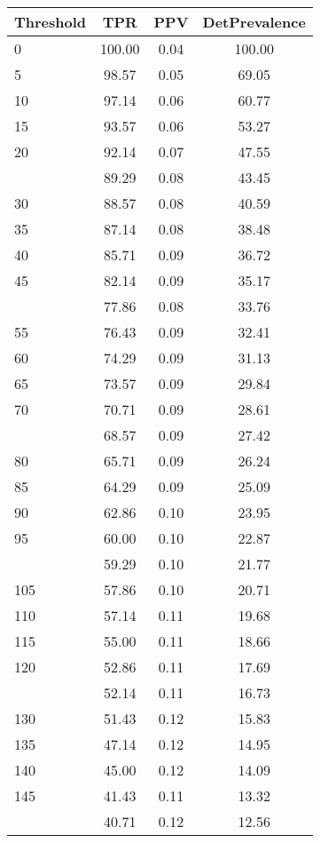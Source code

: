 \begin{table}[ht]
\centering
\begin{tabular}{lccc}
  \toprule
Threshold & TPR & PPV & DetPrevalence \\ 
  \midrule
0 & 100.00 & 0.04 & 100.00 \\ 
  5 & 98.57 & 0.05 & 69.05 \\ 
  10 & 97.14 & 0.06 & 60.77 \\ 
  15 & 93.57 & 0.06 & 53.27 \\ 
  20 & 92.14 & 0.07 & 47.55 \\ 
   \addlinespace
25 & 89.29 & 0.08 & 43.45 \\ 
  30 & 88.57 & 0.08 & 40.59 \\ 
  35 & 87.14 & 0.08 & 38.48 \\ 
  40 & 85.71 & 0.09 & 36.72 \\ 
  45 & 82.14 & 0.09 & 35.17 \\ 
   \addlinespace
50 & 77.86 & 0.08 & 33.76 \\ 
  55 & 76.43 & 0.09 & 32.41 \\ 
  60 & 74.29 & 0.09 & 31.13 \\ 
  65 & 73.57 & 0.09 & 29.84 \\ 
  70 & 70.71 & 0.09 & 28.61 \\ 
   \addlinespace
75 & 68.57 & 0.09 & 27.42 \\ 
  80 & 65.71 & 0.09 & 26.24 \\ 
  85 & 64.29 & 0.09 & 25.09 \\ 
  90 & 62.86 & 0.10 & 23.95 \\ 
  95 & 60.00 & 0.10 & 22.87 \\ 
   \addlinespace
100 & 59.29 & 0.10 & 21.77 \\ 
  105 & 57.86 & 0.10 & 20.71 \\ 
  110 & 57.14 & 0.11 & 19.68 \\ 
  115 & 55.00 & 0.11 & 18.66 \\ 
  120 & 52.86 & 0.11 & 17.69 \\ 
   \addlinespace
125 & 52.14 & 0.11 & 16.73 \\ 
  130 & 51.43 & 0.12 & 15.83 \\ 
  135 & 47.14 & 0.12 & 14.95 \\ 
  140 & 45.00 & 0.12 & 14.09 \\ 
  145 & 41.43 & 0.11 & 13.32 \\ 
   \addlinespace
150 & 40.71 & 0.12 & 12.56 \\ 

\end{tabular}
\end{table}
